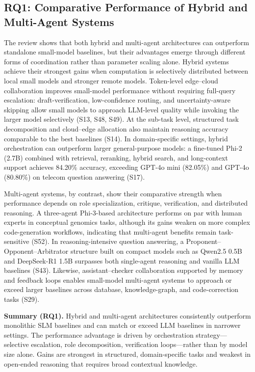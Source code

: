 \subsection{RQ1: Comparative Performance of Hybrid and Multi-Agent Systems}
\label{sec:rq1}

The review shows that both hybrid and multi-agent architectures can outperform standalone small-model baselines, but their advantages emerge through different forms of coordination rather than parameter scaling alone. Hybrid systems achieve their strongest gains when computation is selectively distributed between local small models and stronger remote models. Token-level edge--cloud collaboration improves small-model performance without requiring full-query escalation: draft-verification, low-confidence routing, and uncertainty-aware skipping allow small models to approach LLM-level quality while invoking the larger model selectively (S13, S48, S49). At the sub-task level, structured task decomposition and cloud--edge allocation also maintain reasoning accuracy comparable to the best baselines (S14). In domain-specific settings, hybrid orchestration can outperform larger general-purpose models: a fine-tuned Phi-2 (2.7B) combined with retrieval, reranking, hybrid search, and long-context support achieves 84.20\% accuracy, exceeding GPT-4o mini (82.05\%) and GPT-4o (80.80\%) on telecom question answering (S17).

Multi-agent systems, by contrast, show their comparative strength when performance depends on role specialization, critique, verification, and distributed reasoning. A three-agent Phi-3-based architecture performs on par with human experts in conceptual genomics tasks, although its gains weaken on more complex code-generation workflows, indicating that multi-agent benefits remain task-sensitive (S52). In reasoning-intensive question answering, a Proponent--Opponent--Arbitrator structure built on compact models such as Qwen2.5 0.5B and DeepSeek-R1 1.5B surpasses both single-agent reasoning and vanilla LLM baselines (S43). Likewise, assistant--checker collaboration supported by memory and feedback loops enables small-model multi-agent systems to approach or exceed larger baselines across database, knowledge-graph, and code-correction tasks (S29).

\noindent\textbf{Summary (RQ1).} Hybrid and multi-agent architectures consistently outperform monolithic SLM baselines and can match or exceed LLM baselines in narrower settings. The performance advantage is driven by orchestration strategy---selective escalation, role decomposition, verification loops---rather than by model size alone. Gains are strongest in structured, domain-specific tasks and weakest in open-ended reasoning that requires broad contextual knowledge.

